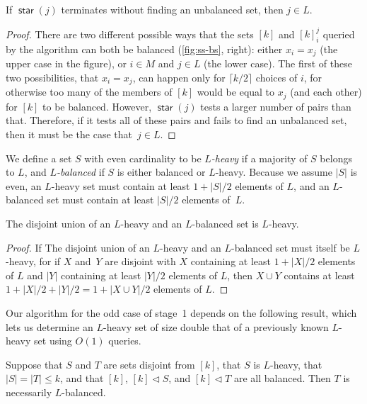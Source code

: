 \documentclass[11pt]{llncs}
\newcommand{\starsub}{\operatorname{\mathsf{star}}}
\newcommand{\inject}{\triangleleft}
\begin{document}
\begin{lemma}
If $\starsub(j)$ terminates without finding an unbalanced set, then $j\in L$.
\end{lemma}

\begin{proof}
There are two different possible ways that the sets $[k]$ and $[k]_i^j$ queried by the algorithm can both be balanced (\autoref{fig:ss-bs}, right): either $x_i=x_j$ (the upper case in the figure), or $i\in M$ and $j\in L$ (the lower case). The first of these two possibilities, that $x_i=x_j$, can happen only for $\lceil k/2\rceil$ choices of $i$, for otherwise too many of the members of $[k]$ would be equal to $x_j$ (and each other) for $[k]$ to be balanced. However, $\starsub(j)$ tests a larger number of pairs than that. Therefore,
if it tests all of these pairs and fails to find an unbalanced set, then it must be the case that~$j\in L$.
\end{proof}

We define a set $S$ with even cardinality to be \emph{$L$-heavy} if a majority of $S$ belongs to $L$, and \emph{$L$-balanced} if $S$ is either balanced or $L$-heavy. Because we assume $|S|$ is even, an $L$-heavy set must contain at least $1+|S|/2$ elements of $L$, and an $L$-balanced set must contain at least $|S|/2$ elements of~$L$.
\ifFull
\begin{lemma}
The disjoint union of an $L$-heavy and an $L$-balanced set is $L$-heavy.
\end{lemma}

\begin{proof}
If
\else
The disjoint union of an $L$-heavy and an $L$-balanced set must itself be $L$-heavy,
for if
\fi
$X$ and~$Y$ are disjoint with $X$ containing at least $1+|X|/2$ elements of $L$ and $|Y|$ containing at least $|Y|/2$ elements of $L$, then $X\cup Y$ contains at least $1+|X|/2+|Y|/2=1+|X\cup Y|/2$ elements of $L$.
\ifFull
\end{proof}
\fi
Our algorithm for the odd case of stage~1 depends on the following result, which lets us determine an $L$-heavy set of size double that of a previously known $L$-heavy set using $O(1)$ queries.

\begin{lemma}
\label{lem:heavy-doubling}
Suppose that $S$ and $T$ are sets disjoint from $[k]$, that $S$ is $L$-heavy, that $|S|=|T|\le k$, and that $[k]$, $[k]\inject S$, and $[k]\inject T$ are all balanced. Then $T$ is necessarily $L$-balanced.
\end{lemma}
\end{document}

